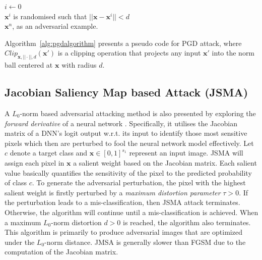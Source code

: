 \begin{algorithm}[!htbp]
\SetAlgoLined
$i \leftarrow 0$\\
$\textbf{x}^i$ is randomised such that $||\textbf{x}-\textbf{x}^i|| < d$\\
\Return $\textbf{x}^n $, as an adversarial example.
\caption{$\functionname{PGDAttack}(f,\textbf{x}, y, ||\cdot||, d, n, \epsilon)$, where $f$ is the original model that the user wants to attack, $\textbf{x}$ is the sample to be attacked, $y$ is the true label of $\textbf{x}$, $||\cdot||$ is the norm distance, $d$ is the radius, $n$ is the number of iterations,  and $\epsilon>0$ is an attack magnitude. }
 \label{alg:pgdalgorithm}
\end{algorithm}


Algorithm~\ref{alg:pgdalgorithm} presents a pseudo code for PGD attack, where $Clip_{\textbf{x},||\cdot||, d}(\textbf{x}')$ is a clipping operation that projects any input $\textbf{x}'$ into  the norm ball centered at $\textbf{x}$ with radius $d$. 



\subsection{Jacobian Saliency Map based Attack (JSMA)}

A $L_0$-norm based adversarial attacking method is also presented by exploring the \emph{forward derivative} of a neural network \cite{JSMA}. Specifically, it utilises the Jacobian matrix of a DNN's logit output w.r.t. its input to identify those most sensitive pixels which then are perturbed to fool the neural network model effectively.
%
%
Let $c$ denote a target class and 
$\textbf{x} \in [0,1]^{s_1}$ represent an input image. JSMA will assign each pixel in $\textbf{x}$ a salient weight based on the Jacobian matrix. Each salient value basically quantifies the sensitivity of the pixel to the predicted probability of class $c$.
%
%
To generate the adversarial perturbation, the pixel with the highest salient weight is firstly perturbed by a \emph{maximum distortion parameter} $\tau > 0$. If the perturbation leads to a mis-classification, then JSMA attack terminates. Otherwise, the algorithm will continue until a mis-classification is achieved. When a maximum $L_0$-norm distortion $d > 0$ is reached, the algorithm also terminates. 
This algorithm is primarily to produce adversarial images that are optimized under the $L_0$-norm distance.
JMSA is generally slower than FGSM due to the computation of the Jacobian matrix. %

